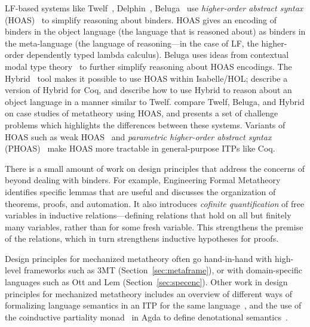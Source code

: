 LF-based systems like Twelf~\citep{Pfenning1999}, Delphin~\citep{poswolsky2009system}, Beluga~\citep{pientka2008programming} use \textit{higher-order abstract syntax} (HOAS)~\citep{Pfenning1988} to simplify reasoning
about binders. HOAS gives an encoding of binders in the object language (the language that is reasoned about) as binders in the meta-language
(the language of reasoning---in the case of LF, the higher-order dependently typed lambda calculus). %
Beluga uses ideas from contextual modal type theory~\citep{nanevski2008contextual} to further simplify reasoning about HOAS encodings.
The Hybrid~\citep{ambler2002} tool makes it possible to use HOAS within Isabelle/HOL;
\cite{capretta2007hybrid} describe a version of Hybrid for Coq, and 
\cite{felty2012hybrid} describe how to use Hybrid to reason about an object language in a manner
similar to Twelf. \cite{felty2010hoas} compare Twelf, Beluga, and Hybrid on case studies
of metatheory using HOAS, and presents
a set of challenge problems which highlights the differences between these systems.
Variants of HOAS such as weak HOAS~\citep{Ciaffaglione2012}
and \textit{parametric higher-order abstract syntax} (PHOAS)~\citep{Chlipala2008}
make HOAS more tractable in general-purpose ITPs like Coq.

There is a small amount of work on design principles that address the concerns of \poplmark beyond dealing with binders.
For example, Engineering Formal Metatheory~\citep{Aydemir2008} 
identifies specific lemmas that are useful and discusses the organization of theorems, proofs, and automation.
It also introduces \textit{cofinite quantification} of free variables in inductive
relations---defining relations that hold on all but finitely many variables, 
rather than for some fresh variable. This strengthens the premise of the relations,
which in turn strengthens inductive hypotheses for proofs. 

Design principles for mechanized metatheory often go hand-in-hand with high-level frameworks such as 3MT (Section~\ref{sec:metaframe}),
or with domain-specific languages such as Ott and Lem (Section~\ref{sec:specenc}).
Other work in design principles for mechanized metatheory includes an overview
of different ways of formalizing language semantics in an ITP
for the same language~\citep{Bertot2009}, and the use of the coinductive partiality monad~\citep{Capretta2005}
in Agda to define denotational semantics~\citep{Danielsson2012}.

